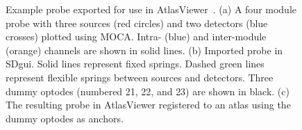 \begin{figure}
\begin{center}
\end{center}
\caption{Example probe exported for use in AtlasViewer~\cite{Aasted2015}. (a) A four module probe with three sources (red circles) and two detectors (blue crosses) plotted using MOCA. Intra- (blue) and inter-module (orange) channels are shown in solid lines. (b) Imported probe in SDgui. Solid lines represent fixed springs. Dashed green lines represent flexible springs between sources and detectors. Three dummy optodes (numbered 21, 22, and 23) are shown in black. (c) The resulting probe in AtlasViewer registered to an atlas using the dummy optodes as anchors.}
\label{fig:SDoutput}

\end{figure} 



